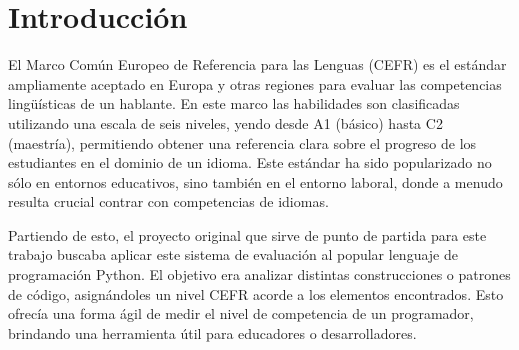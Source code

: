 \documentclass[a4paper, 12pt]{book}
\begin{document}
\cleardoublepage
\chapter{Introducción}
\label{sec:intro} %






El Marco Común Europeo de Referencia para las Lenguas (CEFR) es el estándar ampliamente aceptado en Europa y otras regiones para evaluar las competencias lingüísticas de un hablante. En este marco las habilidades son clasificadas utilizando una escala de seis niveles, yendo desde A1 (básico) hasta C2 (maestría), permitiendo obtener una referencia clara sobre el progreso de los estudiantes en el dominio de un idioma. Este estándar ha sido popularizado no sólo en entornos educativos, sino también en el entorno laboral, donde a menudo resulta crucial contrar con competencias de idiomas.

Partiendo de esto, el proyecto original que sirve de punto de partida para este trabajo buscaba aplicar este sistema de evaluación al popular lenguaje de programación Python. El objetivo era analizar  distintas construcciones o patrones de código, asignándoles un nivel CEFR acorde a los elementos encontrados. Esto ofrecía una forma ágil de medir el nivel de competencia de un programador, brindando una herramienta útil para educadores o desarrolladores.
\end{document}
